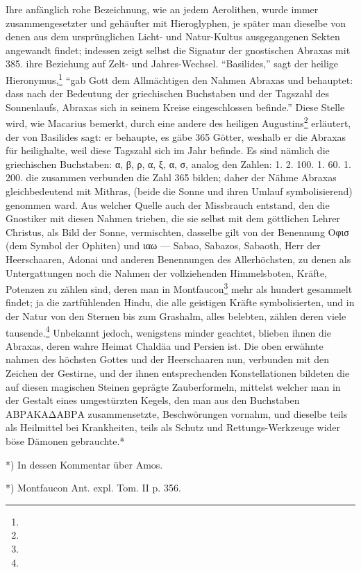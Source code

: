 \documentclass[a4paper, 11pt, oneside, polutonikogreek, german]{article}
\begin{document}
Ihre anfänglich rohe Bezeichnung, wie an jedem Aerolithen, wurde immer zusammengesetzter und gehäufter mit Hieroglyphen, je später man dieselbe von denen aus dem ursprünglichen Licht- und Natur-Kultus ausgegangenen Sekten angewandt findet; indessen zeigt selbst die Signatur der gnostischen Abraxas mit 385. ihre Beziehung auf Zelt- und Jahres-Wechsel. "`Basilides,"' sagt der heilige Hieronymus,\footnote{} "`gab Gott dem Allmächtigen den Nahmen Abraxas und behauptet: dass nach der Bedeutung der griechischen Buchstaben und der Tagszahl des Sonnenlaufs, Abraxas sich in seinem Kreise eingeschlossen befinde."' Diese Stelle wird, wie Macarius bemerkt, durch eine andere des heiligen Augustins\footnote{} erläutert, der von Basilides sagt: er behaupte, es gäbe 365 Götter, weshalb er die Abraxas für heilighalte, weil diese Tagszahl sich im Jahr befinde. Es sind nämlich die griechischen Buchstaben: α, β, ρ, α, ξ, α, σ, analog den Zahlen: 1. 2. 100. 1. 60. 1. 200. die zusammen verbunden die Zahl 365 bilden; daher der Nähme Abraxas gleichbedeutend mit Mithras, (beide die Sonne und ihren Umlauf symbolisierend) genommen ward. Aus welcher Quelle auch der Missbrauch entstand, den die Gnostiker mit diesen Nahmen trieben, die sie selbst mit dem göttlichen Lehrer Christus, als Bild der Sonne, vermischten, dasselbe gilt von der Benennung Οφισ (dem Symbol der Ophiten) und ιαω --- Sabao, Sabazos, Sabaoth, Herr der Heerschaaren, Adonai und anderen Benennungen des Allerhöchsten, zu denen als Untergattungen noch die Nahmen der vollziehenden Himmelsboten, Kräfte, Potenzen zu zählen sind, deren man in Montfaucon\footnote{} mehr als hundert gesammelt findet; ja die zartfühlenden Hindu, die alle geistigen Kräfte symbolisierten, und in der Natur von den Sternen bis zum Grashalm, alles belebten, zählen deren viele tausende.\footnote{} Unbekannt jedoch, wenigstens minder geachtet, blieben ihnen die Abraxas, deren wahre Heimat Chaldäa und Persien ist. Die oben erwähnte nahmen des höchsten Gottes und der Heerschaaren nun, verbunden mit den Zeichen der Gestirne, und der ihnen entsprechenden Konstellationen bildeten die auf diesen magischen Steinen geprägte Zauberformeln, mittelst welcher man in der Gestalt eines umgestürzten Kegels, den man aus den Buchstaben ΑΒΡΑΚΑΔΑΒΡΑ zusammensetzte, Beschwörungen vornahm, und dieselbe teils als Heilmittel bei Krankheiten, teils als Schutz und Rettungs-Werkzeuge wider böse Dämonen gebrauchte.*

*) In dessen Kommentar über Amos.

*) Montfaucon Ant. expl. Tom. II p. 356.
\end{document}
